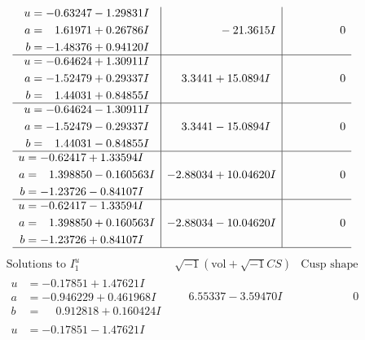\documentclass[1p]{elsarticle_modified}
\theoremstyle{definition}
\newcommand{\I}{\sqrt{-1}}
\begin{document}
$$\begin{array}{c|c|c}
\begin{aligned}
u &= -0.63247 - 1.29831 I \\
a &= \phantom{-}1.61971 + 0.26786 I \\
b &= -1.48376 + 0.94120 I\end{aligned}
 & \phantom{-0.000000 } -21.3615 I & \phantom{-0.000000 } 0 \\ \hline\begin{aligned}
u &= -0.64624 + 1.30911 I \\
a &= -1.52479 + 0.29337 I \\
b &= \phantom{-}1.44031 + 0.84855 I\end{aligned}
 & \phantom{-}3.3441 + 15.0894 I & \phantom{-0.000000 } 0 \\ \hline\begin{aligned}
u &= -0.64624 - 1.30911 I \\
a &= -1.52479 - 0.29337 I \\
b &= \phantom{-}1.44031 - 0.84855 I\end{aligned}
 & \phantom{-}3.3441 - 15.0894 I & \phantom{-0.000000 } 0 \\ \hline\begin{aligned}
u &= -0.62417 + 1.33594 I \\
a &= \phantom{-}1.398850 - 0.160563 I \\
b &= -1.23726 - 0.84107 I\end{aligned}
 & -2.88034 + 10.04620 I & \phantom{-0.000000 } 0 \\ \hline\begin{aligned}
u &= -0.62417 - 1.33594 I \\
a &= \phantom{-}1.398850 + 0.160563 I \\
b &= -1.23726 + 0.84107 I\end{aligned}
 & -2.88034 - 10.04620 I & \phantom{-0.000000 } 0\\
 \hline 
 \end{array}$$\newpage$$\begin{array}{c|c|c}  
\text{Solutions to }I^u_{1}& \I (\text{vol} + \sqrt{-1}CS) & \text{Cusp shape}\\
 \hline 
\begin{aligned}
u &= -0.17851 + 1.47621 I \\
a &= -0.946229 + 0.461968 I \\
b &= \phantom{-}0.912818 + 0.160424 I\end{aligned}
 & \phantom{-}6.55337 - 3.59470 I & \phantom{-0.000000 } 0 \\ \hline\begin{aligned}
u &= -0.17851 - 1.47621 I \\

\end{aligned}
\end{array}$$
\end{document}
